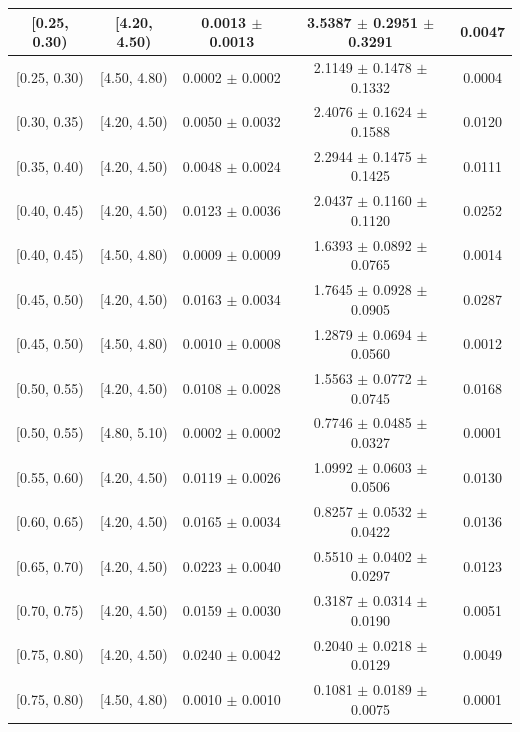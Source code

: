 \begin{longtable}{|c|c|c|c|c|}
\hline
\endlastfoot
[0.25, 0.30) & [4.20, 4.50) & 0.0013 $\pm$ 0.0013 & 3.5387 $\pm$ 0.2951 $\pm$ 0.3291 & 0.0047 \\ 
\hline
[0.25, 0.30) & [4.50, 4.80) & 0.0002 $\pm$ 0.0002 & 2.1149 $\pm$ 0.1478 $\pm$ 0.1332 & 0.0004 \\ 
\hline
[0.30, 0.35) & [4.20, 4.50) & 0.0050 $\pm$ 0.0032 & 2.4076 $\pm$ 0.1624 $\pm$ 0.1588 & 0.0120 \\ 
\hline
[0.35, 0.40) & [4.20, 4.50) & 0.0048 $\pm$ 0.0024 & 2.2944 $\pm$ 0.1475 $\pm$ 0.1425 & 0.0111 \\ 
\hline
[0.40, 0.45) & [4.20, 4.50) & 0.0123 $\pm$ 0.0036 & 2.0437 $\pm$ 0.1160 $\pm$ 0.1120 & 0.0252 \\ 
\hline
[0.40, 0.45) & [4.50, 4.80) & 0.0009 $\pm$ 0.0009 & 1.6393 $\pm$ 0.0892 $\pm$ 0.0765 & 0.0014 \\ 
\hline
[0.45, 0.50) & [4.20, 4.50) & 0.0163 $\pm$ 0.0034 & 1.7645 $\pm$ 0.0928 $\pm$ 0.0905 & 0.0287 \\ 
\hline
[0.45, 0.50) & [4.50, 4.80) & 0.0010 $\pm$ 0.0008 & 1.2879 $\pm$ 0.0694 $\pm$ 0.0560 & 0.0012 \\ 
\hline
[0.50, 0.55) & [4.20, 4.50) & 0.0108 $\pm$ 0.0028 & 1.5563 $\pm$ 0.0772 $\pm$ 0.0745 & 0.0168 \\ 
\hline
[0.50, 0.55) & [4.80, 5.10) & 0.0002 $\pm$ 0.0002 & 0.7746 $\pm$ 0.0485 $\pm$ 0.0327 & 0.0001 \\ 
\hline
[0.55, 0.60) & [4.20, 4.50) & 0.0119 $\pm$ 0.0026 & 1.0992 $\pm$ 0.0603 $\pm$ 0.0506 & 0.0130 \\ 
\hline
[0.60, 0.65) & [4.20, 4.50) & 0.0165 $\pm$ 0.0034 & 0.8257 $\pm$ 0.0532 $\pm$ 0.0422 & 0.0136 \\ 
\hline
[0.65, 0.70) & [4.20, 4.50) & 0.0223 $\pm$ 0.0040 & 0.5510 $\pm$ 0.0402 $\pm$ 0.0297 & 0.0123 \\ 
\hline
[0.70, 0.75) & [4.20, 4.50) & 0.0159 $\pm$ 0.0030 & 0.3187 $\pm$ 0.0314 $\pm$ 0.0190 & 0.0051 \\ 
\hline
[0.75, 0.80) & [4.20, 4.50) & 0.0240 $\pm$ 0.0042 & 0.2040 $\pm$ 0.0218 $\pm$ 0.0129 & 0.0049 \\ 
\hline
[0.75, 0.80) & [4.50, 4.80) & 0.0010 $\pm$ 0.0010 & 0.1081 $\pm$ 0.0189 $\pm$ 0.0075 & 0.0001 \\ 
\hline
\end{longtable}
